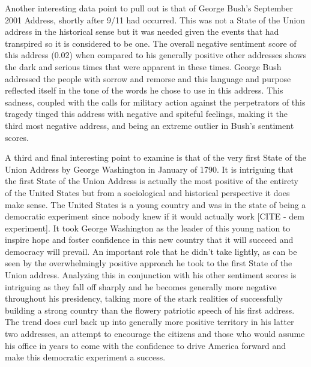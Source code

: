 Another interesting data point to pull out is that of George Bush's September 2001 Address, shortly after 9/11 had occurred.
This was not a State of the Union address in the historical sense but it was needed given the events that had transpired so it is considered to be one.
The overall negative sentiment score of this address (0.02) when compared to his generally positive other addresses shows the dark and serious times that were apparent in these times.
George Bush addressed the people with sorrow and remorse and this language and purpose reflected itself in the tone of the words he chose to use in this address.
This sadness, coupled with the calls for military action against the perpetrators of this tragedy tinged this address with negative and spiteful feelings, making it the third most negative address, and being an extreme outlier in Bush's sentiment scores.

A third and final interesting point to examine is that of the very first State of the Union Address by George Washington in January of 1790.
It is intriguing that the first State of the Union Address is actually the most positive of the entirety of the United States but from a sociological and historical perspective it does make sense.
The United States is a young country and was in the state of being a democratic experiment since nobody knew if it would actually work [CITE - dem experiment].
It took George Washington as the leader of this young nation to inspire hope and foster confidence in this new country that it will succeed and democracy will prevail.
An important role that he didn't take lightly, as can be seen by the overwhelmingly positive approach he took to the first State of the Union address.
Analyzing this in conjunction with his other sentiment scores is intriguing as they fall off sharply and he becomes generally more negative throughout his presidency, talking more of the stark realities of successfully building a strong country than the flowery patriotic speech of his first address.
The trend does curl back up into generally more positive territory in his latter two addresses, an attempt to encourage the citizens and those who would assume his office in years to come with the confidence to drive America forward and make this democratic experiment a success.